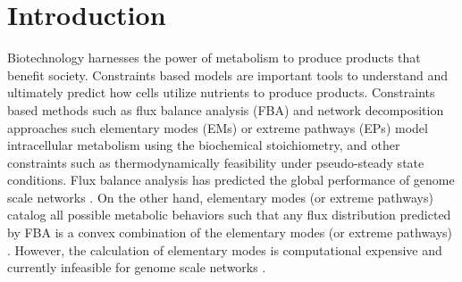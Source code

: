 \documentclass[10pt,twocolumn,twoside,final]{IEEEtran}
\begin{document}
\section{Introduction}

Biotechnology harnesses the power of metabolism to produce products that benefit society.
Constraints based models are important tools to understand and ultimately predict how cells utilize nutrients to produce products.
Constraints based methods such as flux balance analysis (FBA) \cite{2010_orth_NatBiotech} and network decomposition approaches such elementary modes (EMs) \cite{Schuster:2000aa}
or extreme pathways (EPs) \cite{Schilling:2000aa}
model intracellular metabolism using the biochemical stoichiometry, and other constraints such as thermodynamically feasibility under pseudo-steady state conditions.
Flux balance analysis has predicted the global performance of genome scale networks \cite{Covert:2004aa}.
On the other hand, elementary modes (or extreme pathways) catalog all possible metabolic behaviors such that any flux distribution predicted by FBA is a convex combination
of the elementary modes (or extreme pathways) \cite{Wiback:2003aa}.
However, the calculation of elementary modes is computational expensive and currently infeasible for genome scale networks \cite{2004_lee_varner_ko_ieee}.
\end{document}
